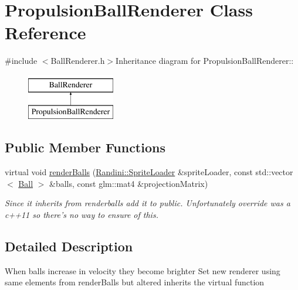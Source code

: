 \hypertarget{classPropulsionBallRenderer}{
\section{PropulsionBallRenderer Class Reference}
\label{classPropulsionBallRenderer}
}


{\ttfamily \#include $<$BallRenderer.h$>$}Inheritance diagram for PropulsionBallRenderer::\begin{figure}[H]
\begin{center}
\leavevmode
\includegraphics[height=2cm]{classPropulsionBallRenderer}
\end{center}
\end{figure}
\subsection*{Public Member Functions}
\begin{DoxyCompactItemize}
\item 
virtual void \hyperlink{classPropulsionBallRenderer_a9ebdecb973a1a399b4699d7e5c47c0b9}{renderBalls} (\hyperlink{classRandini_1_1SpriteLoader}{Randini::SpriteLoader} \&spriteLoader, const std::vector$<$ \hyperlink{structBall}{Ball} $>$ \&balls, const glm::mat4 \&projectionMatrix)
\begin{DoxyCompactList}\small\item\em Since it inherits from renderballs add it to public. Unfortunately override was a c++11 so there's no way to ensure of this. \item\end{DoxyCompactList}\end{DoxyCompactItemize}


\subsection{Detailed Description}
When balls increase in velocity they become brighter Set new renderer using same elements from renderBalls but altered inherits the virtual function 

